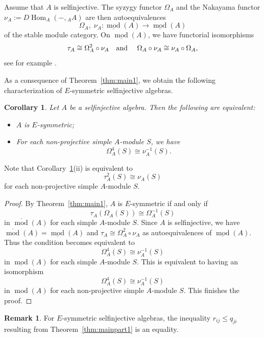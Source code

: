 \documentclass[12pt,reqno]{amsart}
\newtheorem{Cor}[Thm]{Corollary}
\theoremstyle{definition}
\newtheorem{Rem}[Thm]{Remark}
\newcommand{\df}{\colon}
\newcommand{\md}{\operatorname{mod}}
\newcommand{\Hom}{\operatorname{Hom}}
\begin{document}

Assume that $A$ is selfinjective.
The syzygy functor $\Omega_A$ and the
Nakayama functor
$\nu_A := D\!\Hom_A(-,{_A}A)$
are 
then autoequivalences
$$
\Omega_A,\; \nu_A\df \underline{\md}(A) \to \underline{\md}(A)
$$
of the stable module category.
On $\underline{\md}(A)$, we have functorial isomorphisms
$$
\tau_A \cong \Omega_A^2 \circ \nu_A 
\text{\quad and \quad}
\Omega_A \circ \nu_A \cong \nu_A \circ \Omega_A,
$$
see for example \cite[Chapter~IV]{ARS97}. 

As a consequence of Theorem~\ref{thm:main1}, we obtain the
following characterization of $E$-symmetric selfinjective algebras.


\begin{Cor}\label{cor:main2b}
Let $A$ be a selfinjective algebra.
Then the following are equivalent:
\begin{itemize}\itemsep2mm

\item[(i)]
$A$ is $E$-symmetric;

\item[(ii)]
For each non-projective simple $A$-module $S$, we have
$$
\Omega_A^4(S) \cong \nu_A^{-1}(S).
$$
\end{itemize}
\end{Cor}



Note that Corollary~\ref{cor:main2b}(ii) is equivalent to
$$
\tau_A^2(S) \cong \nu_A(S)
$$
for each non-projective simple $A$-module $S$.

\begin{proof}
By 
Theorem~\ref{thm:main1}, $A$ is $E$-symmetric if and only if 
$$
\tau_A(\Omega_A(S)) \cong \Omega_A^{-1}(S)
$$ 
in $\overline{\md}(A)$ for each simple $A$-module $S$.
Since $A$ is selfinjective, we have
$\overline{\md}(A) = \underline{\md}(A)$ and
$\tau_A \cong \Omega_A^2 \circ \nu_A$ as autoequivalences of $\underline{\md}(A)$.
Thus the condition becomes equivalent to 
$$
\Omega^4_A(S) \cong \nu_A^{-1}(S)
$$
in $\underline{\md}(A)$ for each simple $A$-module $S$.
This is equivalent to having an isomorphism
$$
\Omega^4_A(S) \cong \nu_A^{-1}(S)
$$
in $\md(A)$ for each non-projective simple $A$-module $S$.
This finishes the proof.
\end{proof}


\begin{Rem}
For $E$-symmetric selfinjective algebras, the inequality
$r_{ij} \le q_{ji}$ resulting from Theorem~\ref{thm:mainpart1}
is an equality.
\end{Rem}
\end{document}

